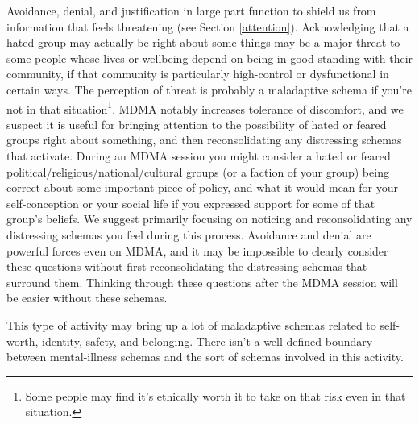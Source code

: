 \documentclass[12pt,letterpaper]{book}
\begin{document}
Avoidance, denial, and justification in large part function to shield us from information that feels threatening (see Section \ref{attention}). Acknowledging that a hated group may actually be right about some things may be a major threat to some people whose lives or wellbeing depend on being in good standing with their community, if that community is particularly high-control or dysfunctional in certain ways. The perception of threat is probably a maladaptive schema if you're not in that situation\footnote{Some people may find it's ethically worth it to take on that risk even in that situation.}. MDMA notably increases tolerance of discomfort, and we suspect it is useful for bringing attention to the possibility of hated or feared groups right about something, and then reconsolidating any distressing schemas that activate. During an MDMA session you might consider a hated or feared political/religious/national/cultural groups (or a faction of your group) being correct about some important piece of policy, and what it would mean for your self-conception or your social life if you expressed support for some of that group's beliefs. We suggest primarily focusing on noticing and reconsolidating any distressing schemas you feel during this process. Avoidance and denial are powerful forces even on MDMA, and it may be impossible to clearly consider these questions without first reconsolidating the distressing schemas that surround them. Thinking through these questions after the MDMA session will be easier without these schemas.

This type of activity may bring up a lot of maladaptive schemas related to self-worth, identity, safety, and belonging. There isn't a well-defined boundary between mental-illness schemas and the sort of schemas involved in this activity.
\end{document}
